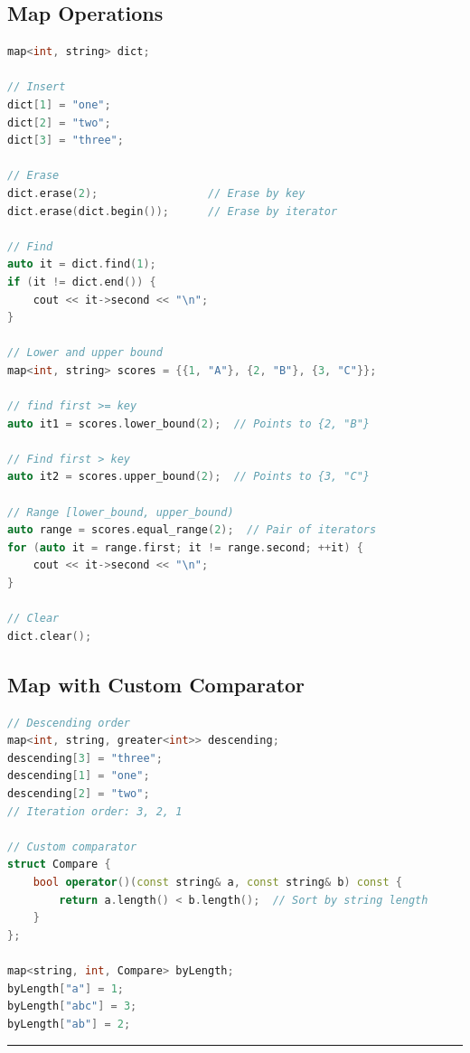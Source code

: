 \hypertarget{map-operations}{%
\subsection{Map Operations}\label{map-operations}}

\begin{lstlisting}[language={C++}]
map<int, string> dict;

// Insert
dict[1] = "one";
dict[2] = "two";
dict[3] = "three";

// Erase
dict.erase(2);                 // Erase by key
dict.erase(dict.begin());      // Erase by iterator

// Find
auto it = dict.find(1);
if (it != dict.end()) {
    cout << it->second << "\n";
}

// Lower and upper bound
map<int, string> scores = {{1, "A"}, {2, "B"}, {3, "C"}};

// find first >= key
auto it1 = scores.lower_bound(2);  // Points to {2, "B"}

// Find first > key
auto it2 = scores.upper_bound(2);  // Points to {3, "C"}

// Range [lower_bound, upper_bound)
auto range = scores.equal_range(2);  // Pair of iterators
for (auto it = range.first; it != range.second; ++it) {
    cout << it->second << "\n";
}

// Clear
dict.clear();
\end{lstlisting}

\hypertarget{map-with-custom-comparator}{%
\subsection{Map with Custom
Comparator}\label{map-with-custom-comparator}}

\begin{lstlisting}[language={C++}]
// Descending order
map<int, string, greater<int>> descending;
descending[3] = "three";
descending[1] = "one";
descending[2] = "two";
// Iteration order: 3, 2, 1

// Custom comparator
struct Compare {
    bool operator()(const string& a, const string& b) const {
        return a.length() < b.length();  // Sort by string length
    }
};

map<string, int, Compare> byLength;
byLength["a"] = 1;
byLength["abc"] = 3;
byLength["ab"] = 2;
\end{lstlisting}

\begin{center}\rule{0.5\linewidth}{0.5pt}\end{center}

